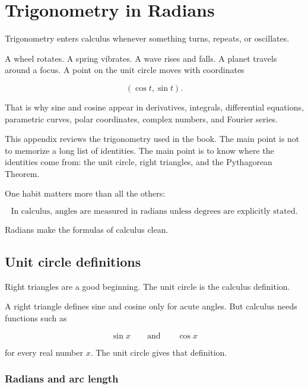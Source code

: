 
\chapter{Trigonometry in Radians}
\label{app:trigonometry-radians}

Trigonometry enters calculus whenever something turns, repeats, or oscillates.

A wheel rotates.  A spring vibrates.  A wave rises and falls.  A planet travels around
a focus.  A point on the unit circle moves with coordinates

\[
(\cos t,\sin t).
\]

That is why sine and cosine appear in derivatives, integrals, differential equations,
parametric curves, polar coordinates, complex numbers, and Fourier series.

This appendix reviews the trigonometry used in the book.  The main point is not to
memorize a long list of identities.  The main point is to know where the identities come
from: the unit circle, right triangles, and the Pythagorean Theorem.

One habit matters more than all the others:

\[
\boxed{
\text{In calculus, angles are measured in radians unless degrees are explicitly stated.}
}
\]

Radians make the formulas of calculus clean.

\section{Unit circle definitions}
\label{appsec:unit-circle-definitions}

Right triangles are a good beginning.  The unit circle is the calculus definition.

A right triangle defines sine and cosine only for acute angles.  But calculus needs
functions such as

\[
\sin x
\qquad\text{and}\qquad
\cos x
\]

for every real number \(x\).  The unit circle gives that definition.

\subsection{Radians and arc length}
\label{appsubsec:radians-arc-length}


